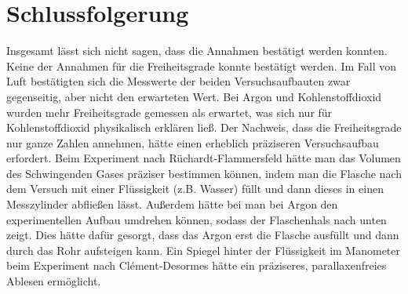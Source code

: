 \documentclass[
	a4paper,
	12pt,
	pagesize,
	ngerman
]{scrartcl}
\begin{document}
	\section{Schlussfolgerung}
	Insgesamt lässt sich nicht sagen, dass die Annahmen bestätigt werden konnten.
	Keine der Annahmen für die Freiheitsgrade konnte bestätigt werden.
	Im Fall von Luft bestätigten sich die Messwerte der beiden Versuchsaufbauten zwar gegenseitig, aber nicht den erwarteten Wert.
	Bei Argon und Kohlenstoffdioxid wurden mehr Freiheitsgrade gemessen als erwartet, was sich nur für Kohlenstoffdioxid physikalisch erklären ließ.
	Der Nachweis, dass die Freiheitsgrade nur ganze Zahlen annehmen, hätte einen erheblich präziseren Versuchsaufbau erfordert.
	Beim Experiment nach Rüchardt-Flammersfeld hätte man das Volumen des Schwingenden Gases präziser bestimmen können, indem man die Flasche nach dem Versuch mit einer Flüssigkeit (z.B. Wasser) füllt und dann dieses in einen Messzylinder abfließen lässt.
	Außerdem hätte bei man bei Argon den experimentellen Aufbau umdrehen können, sodass der Flaschenhals nach unten zeigt.
	Dies hätte dafür gesorgt, dass das Argon erst die Flasche ausfüllt und dann durch das Rohr aufsteigen kann.
	Ein Spiegel hinter der Flüssigkeit im Manometer beim Experiment nach Clément-Desormes hätte ein präziseres, parallaxenfreies Ablesen ermöglicht.
	\printbibliography
\end{document}
